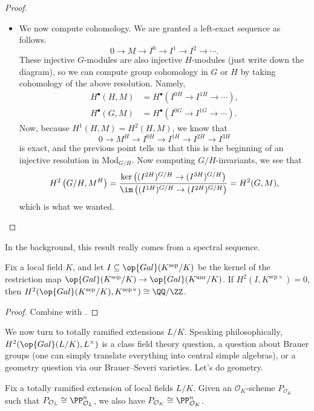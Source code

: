 \documentclass[../notes.tex]{subfiles}
\begin{document}
\begin{proof}
\begin{itemize}
		\item We now compute cohomology. We are granted a left-exact sequence as follows.
		\[0\to M\to I^0\to I^1\to I^2\to\cdots.\]
		These injective $G$-modules are also injective $H$-modules (just write down the diagram), so we can compute group cohomology in $G$ or $H$ by taking cohomology of the above resolution. Namely,
		\begin{align*}
			H^\bullet(H,M) &= H^\bullet\left(I^{0H}\to I^{1H}\to\cdots\right), 
			\\
			H^\bullet(G,M) &= H^\bullet\left(I^{0G}\to I^{1G}\to\cdots\right).
		\end{align*}
		Now, because $H^1(H,M)=H^2(H,M)$, we know that
		\[0\to M^H\to I^{0H}\to I^{1H}\to I^{2H}\to I^{3H}\]
		is exact, and the previous point tells us that this is the beginning of an injective resolution in $\mathrm{Mod}_{G/H}$. Now computing $G/H$-invariants, we see that
		\[H^2\left(G/H,M^H\right)=\frac{\ker\left((I^{2H})^{G/H}\to (I^{3H})^{G/H}\right)}{\im\left((I^{1H})^{G/H}\to (I^{2H})^{G/H}\right)}=H^2(G,M),\]
		which is what we wanted.
		\qedhere
	\end{itemize}
\end{proof}
\begin{remark}
	In the background, this result really comes from a spectral sequence.
\end{remark}
\begin{corollary}
	Fix a local field $K$, and let $I\subseteq\op{Gal}(K^{\mathrm{sep}}/K)$ be the kernel of the restriction map $\op{Gal}(K^{\mathrm{sep}}/K)\to\op{Gal}(K^{\mathrm{unr}}/K)$. If $H^2(I,K^{\mathrm{sep}\times})=0$, then $H^2(\op{Gal}(K^{\mathrm{sep}}/K),K^{\mathrm{sep}\times})\cong\QQ/\ZZ$.
\end{corollary}
\begin{proof}
	Combine  with .
\end{proof}
We now turn to totally ramified extensions $L/K$. Speaking philosophically, $H^2(\op{Gal}(L/K),L^\times)$ is a class field theory question, a question about Brauer groups (one can simply translate everything into central simple algebras), or a geometry question via our Brauer--Severi varieties. Let's do geometry.
\begin{lemma}
	Fix a totally ramified extension of local fields $L/K$. Given an $\mathcal O_K$-scheme $P_{\mathcal O_K}$ such that $P_{\mathcal O_L}\cong\PP^n_{\mathcal O_L}$, we also have $P_{\mathcal O_K}\cong\PP^n_{\mathcal O_K}$.
\end{lemma}
\end{document}
